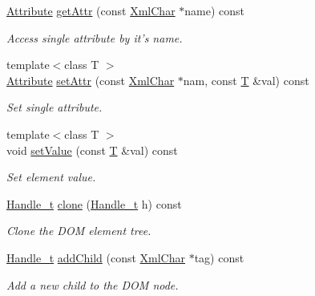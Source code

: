 \begin{DoxyCompactItemize}
\hyperlink{namespace_d_d4hep_1_1_x_m_l_a5c19b7116be99d69b4b22d911357baaf}{Attribute} \hyperlink{class_d_d4hep_1_1_x_m_l_1_1_element_ab73f0eb0a66e90f3d99e9fdc0534ee61}{getAttr} (const \hyperlink{namespace_d_d4hep_1_1_x_m_l_a09e5d9cc86ed782f6826dfe0778c1815}{XmlChar} $\ast$name) const 
\begin{DoxyCompactList}\small\item\em Access single attribute by it's name. \item\end{DoxyCompactList}\item 
{\footnotesize template$<$class T $>$ }\\\hyperlink{namespace_d_d4hep_1_1_x_m_l_a5c19b7116be99d69b4b22d911357baaf}{Attribute} \hyperlink{class_d_d4hep_1_1_x_m_l_1_1_element_a5c24c61084c01b0e23a9c56c13f1498c}{setAttr} (const \hyperlink{namespace_d_d4hep_1_1_x_m_l_a09e5d9cc86ed782f6826dfe0778c1815}{XmlChar} $\ast$nam, const \hyperlink{class_t}{T} \&val) const 
\begin{DoxyCompactList}\small\item\em Set single attribute. \item\end{DoxyCompactList}\item 
{\footnotesize template$<$class T $>$ }\\void \hyperlink{class_d_d4hep_1_1_x_m_l_1_1_element_ac7987875ec4adbd81a46f0f0aebd11bf}{setValue} (const \hyperlink{class_t}{T} \&val) const 
\begin{DoxyCompactList}\small\item\em Set element value. \item\end{DoxyCompactList}\item 
\hyperlink{class_d_d4hep_1_1_x_m_l_1_1_handle__t}{Handle\_\-t} \hyperlink{class_d_d4hep_1_1_x_m_l_1_1_element_a4d422a42cb61ee89846807725d86e498}{clone} (\hyperlink{class_d_d4hep_1_1_x_m_l_1_1_handle__t}{Handle\_\-t} h) const 
\begin{DoxyCompactList}\small\item\em Clone the DOM element tree. \item\end{DoxyCompactList}\item 
\hyperlink{class_d_d4hep_1_1_x_m_l_1_1_handle__t}{Handle\_\-t} \hyperlink{class_d_d4hep_1_1_x_m_l_1_1_element_afe39653d6adf8052df90dc8fcccd71b1}{addChild} (const \hyperlink{namespace_d_d4hep_1_1_x_m_l_a09e5d9cc86ed782f6826dfe0778c1815}{XmlChar} $\ast$tag) const 
\begin{DoxyCompactList}\small\item\em Add a new child to the DOM node. \item\end{DoxyCompactList}\item 

\end{DoxyCompactItemize}
